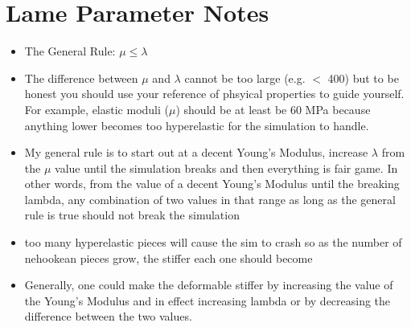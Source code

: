 \documentclass{article}
\begin{document}
\section{Lame Parameter Notes}
\begin{itemize}
    \item The General Rule: $\mu \leq \lambda$
    \item The difference between $\mu$ and $\lambda$ cannot be too large (e.g. $<$ 400) but to be honest you should use your reference of phsyical properties to guide yourself. For example,
    elastic moduli ($\mu$) should be at least be 60 MPa because anything lower becomes too hyperelastic for the simulation to handle.
    \item My general rule is to start out at a decent Young's Modulus, increase $\lambda$ from the $\mu$ value until the simulation breaks and then everything
    is fair game. In other words, from the value of a decent Young's Modulus until the breaking lambda, any combination of two values in that range as long as the general rule is true should not break the simulation
    \item too many hyperelastic pieces will cause the sim to crash so as the number of nehookean pieces grow, the stiffer each one should become
    \item Generally, one could make the deformable stiffer by increasing the value of the Young's Modulus
          and in effect increasing lambda or by decreasing the difference between the two values.
\end{itemize}
\end{document}

